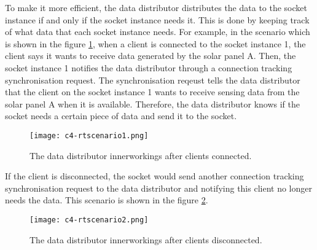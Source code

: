 \documentclass[../thesis.tex]{subfiles}
\begin{document}
To make it more efficient, the data distributor distributes the data to the socket instance if and only if the socket instance needs it. This is done by keeping track of what data that each socket instance needs. For example, in the scenario which is shown in the figure \ref{fig:rtscenario1}, when a client is connected to the socket instance 1, the client says it wants to receive data generated by the solar panel A. Then, the socket instance 1 notifies the data distributor through a connection tracking synchronisation request. The synchronisation reqeust tells the data distributor that the client on the socket instance 1 wants to receive sensing data from the solar panel A when it is available. Therefore, the data distributor knows if the socket needs a certain piece of data and send it to the socket. 

\begin{figure}[!ht]
	\centering
	\texttt{[image: c4-rtscenario1.png]}
	\caption{The data distributor innerworkings after clients connected.}
	\label{fig:rtscenario1}
\end{figure}


If the client is disconnected, the socket would send another connection tracking synchronisation request to the data distributor and notifying this client no longer needs the data. This scenario is shown in the figure \ref{fig:rtscenario2}. 
 
\begin{figure}[!ht]
	\centering
	\texttt{[image: c4-rtscenario2.png]}
	\caption{The data distributor innerworkings after clients disconnected.}
	\label{fig:rtscenario2}
\end{figure}
\end{document}

